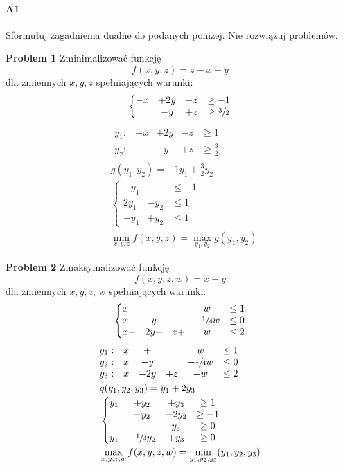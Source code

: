 \documentclass[a4paper,12pt]{article}
\theoremstyle{definition}%
\theoremstyle{definition}
\theoremstyle{problem}
\begin{document}
\paragraph{A1} Sformułuj zagadnienia dualne do podanych poniżej. Nie rozwiązuj problemów.\\
\begin{minipage}{.5\textwidth}
\textbf{Problem 1} Zminimalizować funkcję
$$f(x, y, z) = z - x + y$$
dla zmiennych $x, y, z$ spełniających warunki:
$$\left\{\begin{matrix}
-x &+ 2y &- z &\geq -1\\
&-y &+z &\geq \sfrac{3}{2}
\end{matrix}\right.$$
\begin{align*}
&\begin{matrix}
y_1: & -x&+2y&-z&\geq 1\\
y_2:& &-y&+z&\geq\frac{3}{2}
\end{matrix}\\
&g(y_1,y_2)=-1y_1+\frac{3}{2}y_2\\
&\left\{\begin{matrix}
-y_1 &&\leq -1\\
2y_1&-y_2&\leq 1\\
-y_1&+y_2&\leq 1
\end{matrix}\right.\\
&\min _{x,y,z}f(x,y,z)=\max _{y_1,y_2} g(y_1,y_2)
\end{align*}
\end{minipage}%
\begin{minipage}{.5\textwidth}
\textbf{Problem 2} Zmaksymalizować funkcję
$$f(x, y, z, w) = x - y$$
dla zmiennych $x, y, z$, w spełniających warunki:
$$\left\{\begin{matrix}
x +&&& w &\leq 1\\
x -& y &&- \sfrac{1}{4}w &\leq 0\\
x -&2y +& z +&w &\leq 2
\end{matrix}\right.$$
\begin{align*}
&\begin{matrix}
y_1: & x &+ 	&	& w	&\leq  1\\
y_2: & x &- y  	&	&- \sfrac{1}{4} w &\leq 0\\
y_3: & x &- 2y 	&+z	&+w	&\leq 2
\end{matrix}\\
&g(y_1,y_2,y_3)=y_1+2y_3\\
&\left\{\begin{matrix}
y_1 &+ y_2 &+ y_3 &\geq 1\\
&-y_2 & -2y_2 &\geq -1\\
&&y_3 &\geq 0\\
y_1 &- \sfrac{1}{4} y_2 &+ y_3 &\geq 0
\end{matrix}\right.\\
&\max _{x,y,z,w} f(x,y,z,w)=\min _{y_1,y_2,y_3} (y_1,y_2,y_3)
\end{align*}
\end{minipage}
\end{document}
